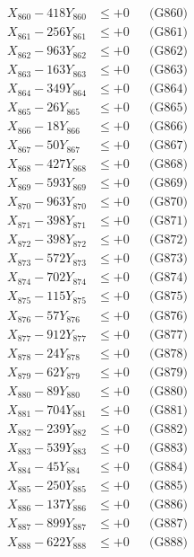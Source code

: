 \documentclass[a4paper,10pt]{article}
\begin{document}
{\begin{align}
X_{860} - 418Y_{860} &\leq +0 && \text{(G860)} \\
\allowbreak
X_{861} - 256Y_{861} &\leq +0 && \text{(G861)} \\
X_{862} - 963Y_{862} &\leq +0 && \text{(G862)} \\
X_{863} - 163Y_{863} &\leq +0 && \text{(G863)} \\
X_{864} - 349Y_{864} &\leq +0 && \text{(G864)} \\
X_{865} - 26Y_{865} &\leq +0 && \text{(G865)} \\
X_{866} - 18Y_{866} &\leq +0 && \text{(G866)} \\
X_{867} - 50Y_{867} &\leq +0 && \text{(G867)} \\
X_{868} - 427Y_{868} &\leq +0 && \text{(G868)} \\
X_{869} - 593Y_{869} &\leq +0 && \text{(G869)} \\
X_{870} - 963Y_{870} &\leq +0 && \text{(G870)} \\
\allowbreak
X_{871} - 398Y_{871} &\leq +0 && \text{(G871)} \\
X_{872} - 398Y_{872} &\leq +0 && \text{(G872)} \\
X_{873} - 572Y_{873} &\leq +0 && \text{(G873)} \\
X_{874} - 702Y_{874} &\leq +0 && \text{(G874)} \\
X_{875} - 115Y_{875} &\leq +0 && \text{(G875)} \\
X_{876} - 57Y_{876} &\leq +0 && \text{(G876)} \\
X_{877} - 912Y_{877} &\leq +0 && \text{(G877)} \\
X_{878} - 24Y_{878} &\leq +0 && \text{(G878)} \\
X_{879} - 62Y_{879} &\leq +0 && \text{(G879)} \\
X_{880} - 89Y_{880} &\leq +0 && \text{(G880)} \\
\allowbreak
X_{881} - 704Y_{881} &\leq +0 && \text{(G881)} \\
X_{882} - 239Y_{882} &\leq +0 && \text{(G882)} \\
X_{883} - 539Y_{883} &\leq +0 && \text{(G883)} \\
X_{884} - 45Y_{884} &\leq +0 && \text{(G884)} \\
X_{885} - 250Y_{885} &\leq +0 && \text{(G885)} \\
X_{886} - 137Y_{886} &\leq +0 && \text{(G886)} \\
X_{887} - 899Y_{887} &\leq +0 && \text{(G887)} \\
X_{888} - 622Y_{888} &\leq +0 && \text{(G888)} \\

\end{align}}
\end{document}
